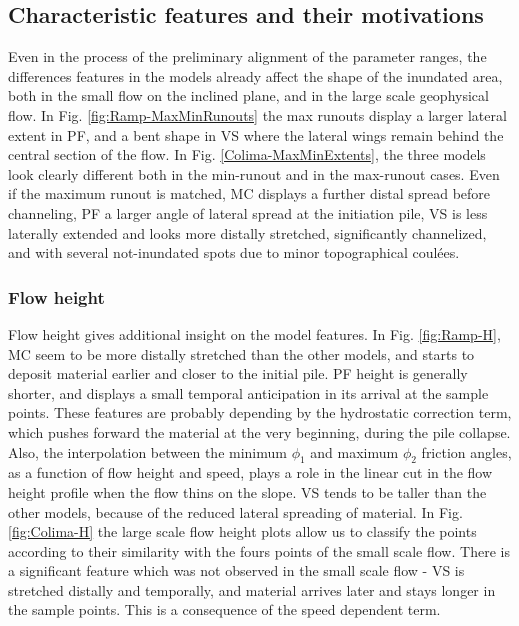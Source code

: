 \documentclass{article}
\begin{document}
\subsection{Characteristic features and their motivations}
Even in the process of the preliminary alignment of the parameter ranges, the differences features in the models already affect the shape of the inundated area, both in the small flow on the inclined plane, and in the large scale geophysical flow. In Fig. \ref{fig:Ramp-MaxMinRunouts} the max runouts display a larger lateral extent in PF, and a bent shape in VS where the lateral wings remain behind the central section of the flow. In Fig. \ref{Colima-MaxMinExtents}, the three models look clearly different both in the min-runout and in the max-runout cases. Even if the maximum runout is matched, MC displays a further distal spread before channeling, PF a larger angle of lateral spread at the initiation pile, VS is less laterally extended and looks more distally stretched, significantly channelized, and with several not-inundated spots due to minor topographical coul\'{e}es.

\subsubsection{Flow height}
Flow height gives additional insight on the model features. In Fig. \ref{fig:Ramp-H}, MC seem to be more distally stretched than the other models, and starts to deposit material earlier and closer to the initial pile. PF height is generally shorter, and displays a small temporal anticipation in its arrival at the sample points. These features are probably depending by the hydrostatic correction term, which pushes forward the material at the very beginning, during the pile collapse. Also, the interpolation between the minimum $\phi_1$ and maximum $\phi_2$ friction angles, as a function of flow height and speed, plays a role in the linear cut in the flow height profile when the flow thins on the slope. VS tends to be taller than the other models, because of the reduced lateral spreading of material. In Fig. \ref{fig:Colima-H} the large scale flow height plots allow us to classify the points according to their similarity with the fours points of the small scale flow. There is a significant feature which was not observed in the small scale flow - VS is stretched distally and temporally, and material arrives later and stays longer in the sample points. This is a consequence of the speed dependent term.
\end{document}
